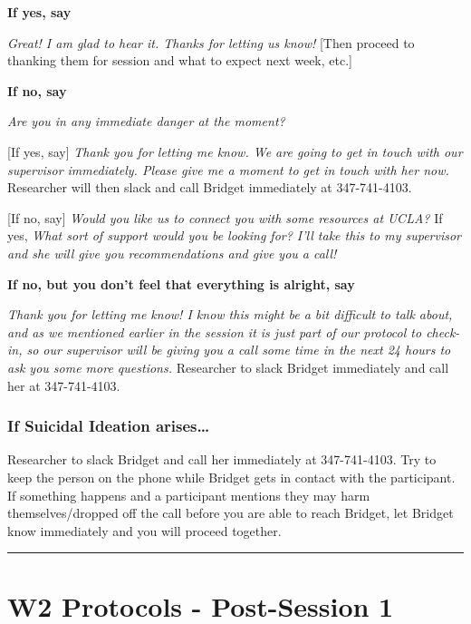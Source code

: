 \documentclass[]{book}
\begin{document}
\textbf{If yes, say}

\emph{Great! I am glad to hear it. Thanks for letting us know!} {[}Then proceed to thanking them for session and what to expect next week, etc.{]}

\textbf{If no, say}

\emph{Are you in any immediate danger at the moment?}

{[}If yes, say{]} \emph{Thank you for letting me know. We are going to get in touch with our supervisor immediately. Please give me a moment to get in touch with her now.} Researcher will then slack and call Bridget immediately at 347-741-4103.

{[}If no, say{]} \emph{Would you like us to connect you with some resources at UCLA?} If yes, \emph{What sort of support would you be looking for? I'll take this to my supervisor and she will give you recommendations and give you a call!}

\textbf{If no, but you don't feel that everything is alright, say}

\emph{Thank you for letting me know! I know this might be a bit difficult to talk about, and as we mentioned earlier in the session it is just part of our protocol to check-in, so our supervisor will be giving you a call some time in the next 24 hours to ask you some more questions.} Researcher to slack Bridget immediately and call her at 347-741-4103.

\hypertarget{if-suicidal-ideation-arises-1}{%
\subsubsection{If Suicidal Ideation arises\ldots{}}\label{if-suicidal-ideation-arises-1}}

Researcher to slack Bridget and call her immediately at 347-741-4103. Try to keep the person on the phone while Bridget gets in contact with the participant. If something happens and a participant mentions they may harm themselves/dropped off the call before you are able to reach Bridget, let Bridget know immediately and you will proceed together.

\begin{center}\rule{0.5\linewidth}{0.5pt}\end{center}

\hypertarget{w2-protocols---post-session-1}{%
\section{W2 Protocols - Post-Session 1}\label{w2-protocols---post-session-1}}
\end{document}

